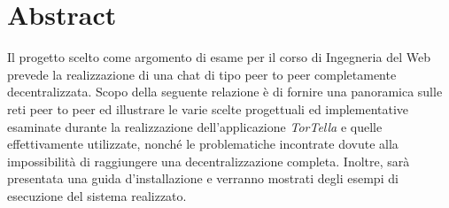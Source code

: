 \chapter*{Abstract}
Il progetto scelto come argomento di esame per il corso di Ingegneria del Web prevede la realizzazione di una chat di tipo peer to peer completamente decentralizzata. Scopo della seguente relazione è di fornire una panoramica sulle reti peer to peer ed illustrare le varie scelte progettuali ed implementative esaminate durante la realizzazione dell’applicazione \textit{TorTella} e quelle effettivamente utilizzate, nonché le problematiche incontrate dovute alla impossibilità di raggiungere una decentralizzazione completa. Inoltre, sarà presentata una guida d'installazione e verranno mostrati degli esempi di esecuzione del sistema realizzato.